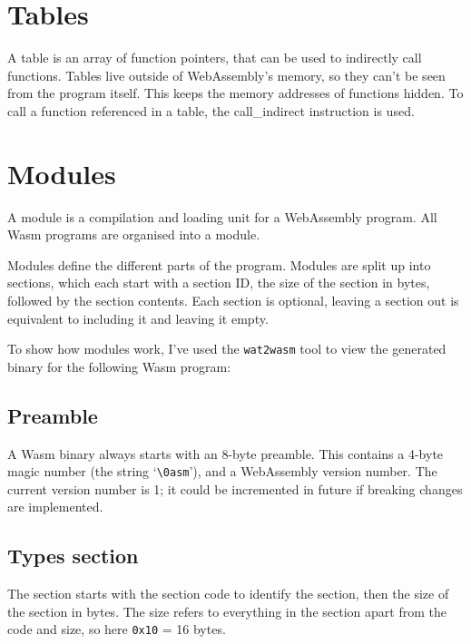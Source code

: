 \documentclass[10pt,a4paper]{article}
\begin{document}
\section*{Tables}

A table is an array of function pointers, that can be used to indirectly call functions. Tables live outside of WebAssembly's memory, so they can't be seen from the program itself. This keeps the memory addresses of functions hidden. To call a function referenced in a table, the \textsf{call\_indirect} instruction is used.

\section*{Modules}

\newcommand{\codedescription}[1]{\textit{\small#1}}

A module is a compilation and loading unit for a WebAssembly program.
All Wasm programs are organised into a module.

Modules define the different parts of the program.
Modules are split up into sections, which each start with a section ID, the size of the section in bytes, followed by the section contents. Each section is optional, leaving a section out is equivalent to including it and leaving it empty.

To show how modules work, I've used the \texttt{wat2wasm} tool to view the generated binary for the following Wasm program:



\subsection*{Preamble}

A Wasm binary always starts with an 8-byte preamble. This contains a 4-byte magic number (the string `\texttt{\textbackslash0asm}'), and a WebAssembly version number. The current version number is 1; it could be incremented in future if breaking changes are implemented.




\subsection*{Types section}

The section starts with the section code to identify the section, then the size of the section in bytes. The size refers to everything in the section apart from the code and size, so here \texttt{0x10} = 16 bytes.
\end{document}

